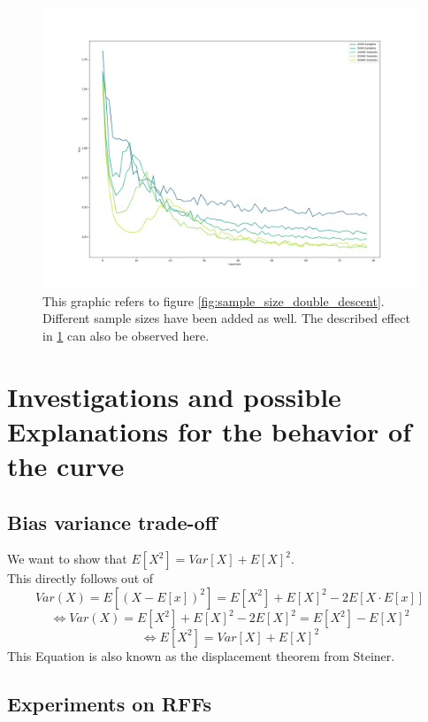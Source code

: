 \begin{figure}[!htp]
\centering
\includegraphics[width= 0.8\linewidth]{Abschlussarbeit_2021/LaTeX/images/many_samplesizes.png}
\caption{This graphic refers to figure \ref{fig:sample_size_double_descent}. Different sample sizes have been added as well. The described effect in \ref{more_noise_can_hurt} can also be observed here.}
\label{more_noise_can_hurt}
\end{figure}


\section{Investigations and possible Explanations for the behavior of the curve}

\subsection{Bias variance trade-off}
\label{bv_help_eq}
We want to show that $E[X^2] = Var[X] + E[X]^2$. \\
This directly follows out of 
$$
Var(X) = E[(X-E[x])^2] = E[X^2] + E[X]^2 - 2E[X\cdot E[x]]
$$
$$
\Longleftrightarrow Var(X) = E[X^2] + E[X]^2 - 2E[X]^2 = E[X^2] - E[X]^2 
$$
$$
\Longleftrightarrow E[X^2] = Var[X] + E[X]^2
$$
This Equation is also known as the displacement theorem from Steiner.

\subsection{Experiments on RFFs}

